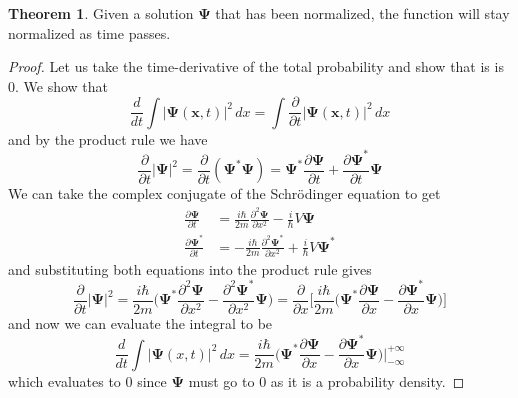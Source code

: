 \documentclass{article}
\theoremstyle{definition}
\newtheorem{theorem}{Theorem}[section]
\begin{document}
    \begin{theorem} 
      Given a solution $\boldsymbol{\Psi}$ that has been normalized, the function will stay normalized as time passes. 
    \end{theorem}
    \begin{proof} 
      Let us take the time-derivative of the total probability and show that is is $0$. We show that 
      \begin{equation} 
        \frac{d}{dt}  \int |\boldsymbol{\Psi} (\mathbf{x}, t)|^2 \,dx = \int \frac{\partial}{\partial t} |\boldsymbol{\Psi}(\mathbf{x}, t)|^2 \,dx
      \end{equation}
      and by the product rule we have 
      \begin{equation} 
        \frac{\partial}{\partial t} |\boldsymbol{\Psi}|^2 = \frac{\partial}{\partial t} (\boldsymbol{\Psi}^\ast \boldsymbol{\Psi}) = \boldsymbol{\Psi}^\ast \frac{\partial \boldsymbol{\Psi}}{\partial t} + \frac{\partial \boldsymbol{\Psi}^\ast}{\partial t} \boldsymbol{\Psi}
      \end{equation}
      We can take the complex conjugate of the Schr\"odinger equation to get 
      \begin{align} 
        \frac{\partial \boldsymbol{\Psi}}{\partial t} & = \frac{i \hbar}{2m} \frac{\partial^2 \boldsymbol{\Psi}}{\partial x^2} - \frac{i}{\hbar} V \boldsymbol{\Psi} \\
        \frac{\partial \boldsymbol{\Psi}^\ast}{\partial t} & = - \frac{i \hbar}{2m} \frac{\partial^2 \boldsymbol{\Psi}^\ast}{\partial x^2} + \frac{i}{\hbar} V \boldsymbol{\Psi}^\ast 
      \end{align}
      and substituting both equations into the product rule gives 
      \begin{equation} 
        \frac{\partial}{\partial t} |\boldsymbol{\Psi}|^2 = \frac{i \hbar}{2m} \bigg( \boldsymbol{\Psi}^\ast \frac{\partial^2 \boldsymbol{\Psi}}{\partial x^2} - \frac{\partial^2 \boldsymbol{\Psi}^\ast}{\partial x^2} \boldsymbol{\Psi} \bigg) = \frac{\partial}{\partial x} \bigg[ \frac{i \hbar}{2m} \bigg( \boldsymbol{\Psi}^\ast \frac{\partial \boldsymbol{\Psi}}{\partial x} - \frac{\partial \boldsymbol{\Psi}^\ast}{\partial x} \boldsymbol{\Psi} \bigg)\bigg]
      \end{equation}
      and now we can evaluate the integral to be 
      \begin{equation} 
        \frac{d}{dt} \int |\boldsymbol{\Psi}(x, t)|^2 \,dx = \frac{i \hbar}{2m} \big( \boldsymbol{\Psi}^\ast \frac{\partial \boldsymbol{\Psi}}{\partial x} - \frac{\partial \boldsymbol{\Psi}^\ast}{\partial x} \boldsymbol{\Psi} \bigg) \bigg|_{-\infty}^{+\infty} 
      \end{equation}
      which evaluates to $0$ since $\boldsymbol{\Psi}$ must go to $0$ as it is a probability density. 
    \end{proof}
\end{document}

